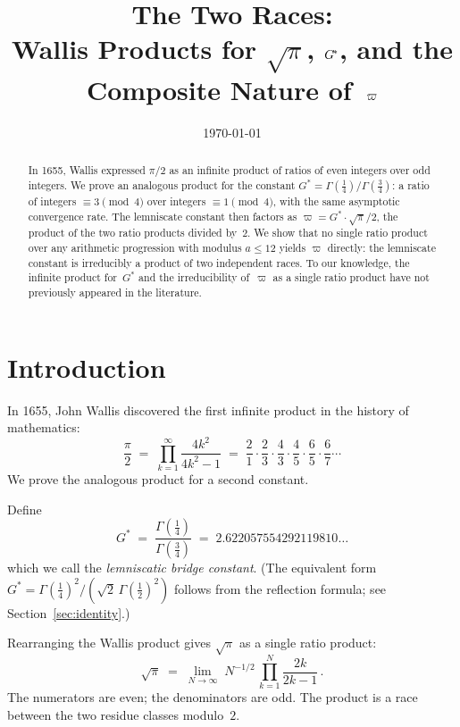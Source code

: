 \documentclass[12pt,reqno]{amsart}
\title{The Two Races:\\[2pt]
  Wallis Products for $\sqrt{\pi}$, $\Gstar$,
  and the Composite Nature of~$\varpiup$}
\author{}
\date{\today}
\theoremstyle{definition}
\theoremstyle{remark}
\newcommand{\Gstar}{G^{\!*}}
\newcommand{\varpiup}{\varpi}
\begin{document}
\begin{abstract}
In 1655, Wallis expressed $\pi/2$ as an infinite product of ratios of
even integers over odd integers.  We prove an analogous product for the
constant $\Gstar = \Gamma(\tfrac14)/\Gamma(\tfrac34)$: a ratio of
integers $\equiv 3\pmod{4}$ over integers $\equiv 1\pmod{4}$, with the
same asymptotic convergence rate.  The lemniscate constant then factors
as $\varpiup = \Gstar\!\cdot\!\sqrt{\pi}/2$, the product of the two
ratio products divided by~$2$.  We show that no single ratio product
over any arithmetic progression with modulus $a \le 12$ yields
$\varpiup$ directly: the lemniscate constant is irreducibly a product
of two independent races.  To our knowledge, the infinite product
for~$\Gstar$ and the irreducibility of~$\varpiup$ as a single ratio
product have not previously appeared in the literature.
\end{abstract}

\maketitle
\tableofcontents


\section{Introduction}

In 1655, John Wallis discovered the first infinite product in the
history of mathematics:
\begin{equation}\label{eq:wallis-classical}
  \frac{\pi}{2} \;=\;
  \prod_{k=1}^{\infty}\frac{4k^{2}}{4k^{2}-1}
  \;=\; \frac{2}{1}\cdot\frac{2}{3}\cdot\frac{4}{3}\cdot\frac{4}{5}
  \cdot\frac{6}{5}\cdot\frac{6}{7}\cdots
\end{equation}
We prove the analogous product for a second constant.

Define
\begin{equation}\label{eq:Gstar-def}
  \Gstar \;=\; \frac{\Gamma(\tfrac14)}{\Gamma(\tfrac34)}
  \;=\; 2.622057554292119810\ldots
\end{equation}
which we call the \emph{lemniscatic bridge constant}.  (The equivalent
form $\Gstar = \Gamma(\tfrac14)^{2}/(\sqrt{2}\,\Gamma(\tfrac12)^{2})$
follows from the reflection formula; see Section~\ref{sec:identity}.)

Rearranging the Wallis product gives $\sqrt{\pi}$ as a single ratio
product:
\begin{equation}\label{eq:wallis-sqrt}
  \sqrt{\pi} \;=\; \lim_{N\to\infty}\;N^{-1/2}\,
  \prod_{k=1}^{N}\frac{2k}{2k-1}\,.
\end{equation}
The numerators are even; the denominators are odd.  The product is a
race between the two residue classes modulo~$2$.
\end{document}

